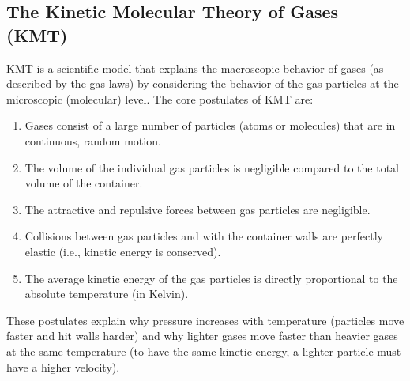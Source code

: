 \documentclass{article}
\begin{document}
\subsection{The Kinetic Molecular Theory of Gases (KMT)}
KMT is a scientific model that explains the macroscopic behavior of gases (as described by the gas laws) by considering the behavior of the gas particles at the microscopic (molecular) level. The core postulates of KMT are:
\begin{enumerate}
    \item Gases consist of a large number of particles (atoms or molecules) that are in continuous, random motion.
    \item The volume of the individual gas particles is negligible compared to the total volume of the container.
    \item The attractive and repulsive forces between gas particles are negligible.
    \item Collisions between gas particles and with the container walls are perfectly elastic (i.e., kinetic energy is conserved).
    \item The average kinetic energy of the gas particles is directly proportional to the absolute temperature (in Kelvin).
\end{enumerate}
These postulates explain why pressure increases with temperature (particles move faster and hit walls harder) and why lighter gases move faster than heavier gases at the same temperature (to have the same kinetic energy, a lighter particle must have a higher velocity).
\end{document}
